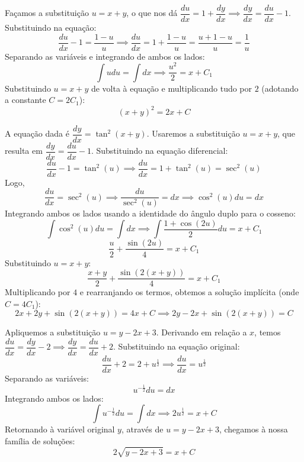\documentclass[oneside,12pt,a4paper]{report}
\begin{document}
    \begin{resolucao}
        \itemresolucao Façamos a substituição $u=x+y$, o que nos dá $\dfrac{du}{dx}=1+\dfrac{dy}{dx} \implies \dfrac{dy}{dx}=\dfrac{du}{dx}-1$.
        Substituindo na equação:
        \[\frac{du}{dx}-1=\frac{1-u}{u} \implies \frac{du}{dx}=1+\frac{1-u}{u}=\frac{u+1-u}{u}=\frac{1}{u}\]
        Separando as variáveis e integrando de ambos os lados:
        \[\int udu=\int dx \implies \frac{u^2}{2}=x+C_1\]
        Substituindo $u=x+y$ de volta à equação e multiplicando tudo por $2$ (adotando a constante $C=2C_1$):
        \[\boxed{(x+y)^2=2x+C}\]

        \itemresolucao A equação dada é $\dfrac{dy}{dx}=\tan^2(x+y)$. 
        Usaremos a substituição $u=x+y$, que resulta em $\dfrac{dy}{dx}=\dfrac{du}{dx}-1$.
        Substituindo na equação diferencial:
        \[\frac{du}{dx}-1=\tan^2(u) \implies \frac{du}{dx}=1+\tan^2(u)=\sec^2(u)\]
        Logo,
        \[\frac{du}{dx}=\sec^2(u) \implies \frac{du}{\sec^2(u)}=dx \implies \cos^2(u)du=dx\]
        Integrando ambos os lados usando a identidade do ângulo duplo para o cosseno:
        \[\int \cos^2(u)du=\int dx \implies \int \frac{1+\cos(2u)}{2}du = x+C_1\]
        \[\frac{u}{2}+\frac{\sin(2u)}{4}=x+C_1\]
        Substituindo $u=x+y$:
        \[\frac{x+y}{2}+\frac{\sin(2(x+y))}{4}=x+C_1\]
        Multiplicando por $4$ e rearranjando os termos, obtemos a solução implícita (onde $C=4C_1$):
        \[2x+2y+\sin(2(x+y))=4x+C \implies \boxed{2y-2x+\sin(2(x+y))=C}\]

        \itemresolucao Apliquemos a substituição $u=y-2x+3$. Derivando em relação a $x$, temos $\dfrac{du}{dx}=\dfrac{dy}{dx}-2 \implies \dfrac{dy}{dx}=\dfrac{du}{dx}+2$.
        Substituindo na equação original:
        \[\frac{du}{dx}+2=2+u^{\frac{1}{2}} \implies \frac{du}{dx}=u^{\frac{1}{2}}\]
        Separando as variáveis:
        \[u^{-\frac{1}{2}}du=dx\]
        Integrando ambos os lados:
        \[\int u^{-\frac{1}{2}}du=\int dx \implies 2u^{\frac{1}{2}}=x+C\]
        Retornando à variável original $y$, através de $u=y-2x+3$, chegamos à nossa família de soluções:
        \[\boxed{2\sqrt{y-2x+3}=x+C}\]


\end{resolucao}
\end{document}
